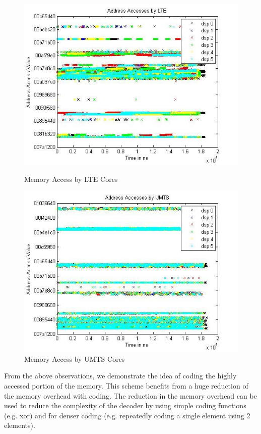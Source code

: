 \begin{figure}[htbp]
	\begin{minipage}{0.5\linewidth}
		\includegraphics[width=\linewidth]{fig/core_access1.jpg}
		\caption{Memory Access by LTE Cores}
		\label{fig:dsp_access1}
	\end{minipage}
	\begin{minipage}{0.5\linewidth}
		\includegraphics[width=\linewidth]{fig/core_access2.jpg}
		\caption{Memory Access by UMTS Cores}
		\label{fig:dsp_access2}
	\end{minipage}
\end{figure} From the above observations, we demonstrate the idea of coding the 
highly accessed portion of the memory. This scheme benefits from a huge 
reduction of the memory overhead with coding. The reduction in the memory 
overhead can be used to reduce the complexity of the decoder by using simple 
coding functions (e.g. xor) and for denser coding (e.g. repeatedly coding a 
single element using 2 elements). 

